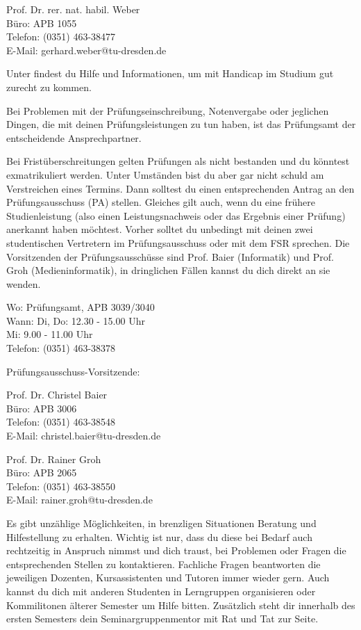 Prof. Dr. rer. nat. habil. Weber \\
Büro: APB 1055 \\
Telefon: (0351) 463-38477 \\
E-Mail: gerhard.weber@tu-dresden.de

Unter  findest du Hilfe und Informationen, um mit Handicap im Studium gut zurecht zu kommen.

\newpage

Bei Problemen mit der Prüfungseinschreibung, Notenvergabe oder jeglichen Dingen, die mit deinen Prüfungsleistungen zu tun haben, ist das Prüfungsamt der entscheidende Ansprechpartner.

Bei Fristüberschreitungen gelten Prüfungen als nicht bestanden und du könntest exmatrikuliert werden.
Unter Umständen bist du aber gar nicht schuld am Verstreichen eines Termins.
Dann solltest du einen entsprechenden Antrag an den Prüfungsausschuss (PA) stellen.
Gleiches gilt auch, wenn du eine frühere Studienleistung (also einen Leistungsnachweis oder das Ergebnis einer Prüfung) anerkannt haben möchtest.
Vorher solltet du unbedingt mit deinen zwei studentischen Vertretern im Prüfungsausschuss oder mit dem FSR sprechen.
Die Vorsitzenden der Prüfungsausschüsse sind Prof. Baier (Informatik) und Prof. Groh (Medieninformatik), in dringlichen Fällen kannst du dich direkt an sie wenden.

Wo: Prüfungsamt, APB 3039/3040 \\
Wann: Di, Do: 12.30 - 15.00 Uhr \\
Mi: 9.00 - 11.00 Uhr \\
Telefon: (0351) 463-38378

Prüfungsausschuss-Vorsitzende:

\begin{multicols}{2}
Prof. Dr. Christel Baier \\
Büro: APB 3006 \\
Telefon: (0351) 463-38548 \\
E-Mail: christel.baier@tu-dresden.de

Prof. Dr. Rainer Groh \\
Büro: APB 2065 \\
Telefon: (0351) 463-38550 \\
E-Mail: rainer.groh@tu-dresden.de
\end{multicols}

Es gibt unzählige Möglichkeiten, in brenzligen Situationen Beratung und Hilfestellung zu erhalten.
Wichtig ist nur, dass du diese bei Bedarf auch rechtzeitig in Anspruch nimmst und dich traust, bei Problemen oder Fragen die entsprechenden Stellen zu kontaktieren.
Fachliche Fragen beantworten die jeweiligen Dozenten, Kursassistenten und Tutoren immer wieder gern.
Auch kannst du dich mit anderen Studenten in Lerngruppen organisieren oder Kommilitonen älterer Semester um Hilfe bitten.
Zusätzlich steht dir innerhalb des ersten Semesters dein Seminargruppenmentor mit Rat und Tat zur Seite.
